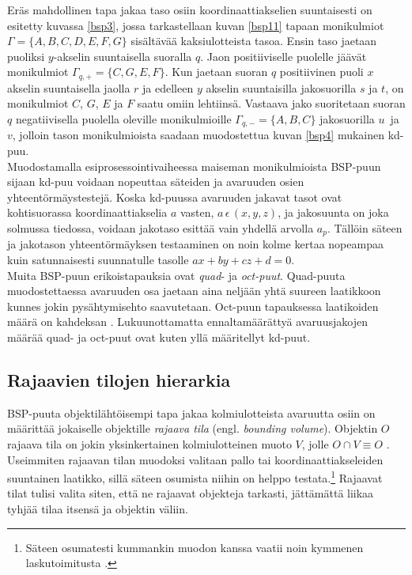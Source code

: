 \documentclass[a4paper, 12pt, titlepage]{article}
\begin{document}
Eräs mahdollinen tapa jakaa taso osiin koordinaattiakselien suuntaisesti on esitetty kuvassa \ref{bsp3}, jossa tarkastellaan kuvan \ref{bsp11} tapaan monikulmiot $\Gamma=\{A,B,C,D,E,F,G\}$ sisältävää kaksiulotteista tasoa. Ensin taso jaetaan puoliksi $y$-akselin suuntaisella suoralla $q$. Jaon positiiviselle puolelle jäävät monikulmiot $\Gamma_{q,+} = \{C,G,E,F\}$. Kun jaetaan suoran $q$ positiivinen puoli $x$ akselin suuntaisella jaolla $r$ ja edelleen $y$ akselin suuntaisilla jakosuorilla $s$ ja $t$, on monikulmiot $C$, $G$, $E$ ja $F$ saatu omiin lehtiinsä. Vastaava jako suoritetaan suoran $q$ negatiivisella puolella oleville monikulmioille $\Gamma_{q,-} = \{A,B,C\}$ jakosuorilla $u$ ja $v$, jolloin tason monikulmioista saadaan muodostettua kuvan \ref{bsp4} mukainen kd-puu.\\ 

Muodostamalla esiprosessointivaiheessa maiseman monikulmioista BSP-puun sijaan kd-puu voidaan nopeuttaa säteiden ja avaruuden osien yhteentörmäystestejä. Koska kd-puussa avaruuden jakavat tasot ovat kohtisuorassa koordinaattiakselia $a$ vasten, $a\,\epsilon\,(x, y, z)$, ja jakosuunta on joka solmussa tiedossa, voidaan jakotaso esittää vain yhdellä arvolla $a_p$. Tällöin säteen ja jakotason yhteentörmäyksen testaaminen on noin kolme kertaa nopeampaa kuin satunnaisesti suunnatulle tasolle $ax + by + cz + d = 0$. \citep[.]{havran}\\



Muita BSP-puun erikoistapauksia ovat \emph{quad}- ja \emph{oct-puut}. Quad-puuta muodostettaessa avaruuden osa jaetaan aina neljään yhtä suureen laatikkoon kunnes jokin pysähtymisehto saavutetaan. Oct-puun tapauksessa laatikoiden määrä on kahdeksan \citep[.]{samet}. Lukuunottamatta ennaltamäärättyä avaruusjakojen määrää quad- ja oct-puut ovat kuten yllä määritellyt kd-puut.

\subsection{Rajaavien tilojen hierarkia}

BSP-puuta objektilähtöisempi tapa jakaa kolmiulotteista avaruutta osiin on määrittää jokaiselle objektille \emph{rajaava tila} (engl. \emph{bounding volume}). Objektin $O$ rajaava tila on jokin yksinkertainen kolmiulotteinen muoto $V$, jolle $O \cap V \equiv O$ \citep{havran}. Useimmiten rajaavan tilan muodoksi valitaan pallo tai koordinaattiakseleiden suuntainen laatikko, sillä säteen osumista niihin on helppo testata.\footnote{Säteen osumatesti kummankin muodon kanssa vaatii noin kymmenen laskutoimitusta \citep{goldsmith}.} Rajaavat tilat tulisi valita siten, että ne rajaavat objekteja tarkasti, jättämättä liikaa tyhjää tilaa itsensä ja objektin väliin. \citep{hughes} \\
\end{document}
